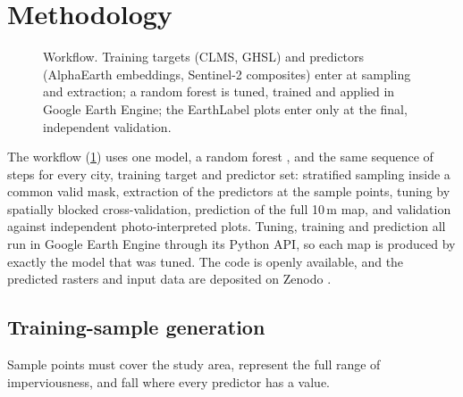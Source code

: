 %

\section{Methodology}
\label{sec:method}

\begin{figure}[htbp]
  \centering
  \caption{Workflow. Training targets (CLMS, GHSL) and predictors (AlphaEarth
  embeddings, Sentinel-2 composites) enter at sampling and extraction; a
  random forest is tuned, trained and applied in Google Earth Engine; the
  EarthLabel plots enter only at the final, independent validation.}
  \label{fig:workflow}
\end{figure}

The workflow (\cref{fig:workflow}) uses one model, a random forest
\cite{breiman2001rf}, and the same sequence of steps for every city,
training target and predictor set: stratified sampling inside a common valid
mask, extraction of the predictors at the sample points, tuning by spatially
blocked cross-validation, prediction of the full 10\,m map, and validation
against independent photo-interpreted plots. Tuning, training and
prediction all run in Google Earth Engine \cite{gorelick2017gee} through its
Python API, so each map is produced by exactly the model that was tuned. The
code is openly available, and the predicted rasters and input data are
deposited on Zenodo \cite{brovelli2026zenodo}.

\subsection{Training-sample generation}
\label{sec:sampling}

Sample points must cover the study area, represent the full range of
imperviousness, and fall where every predictor has a value.

